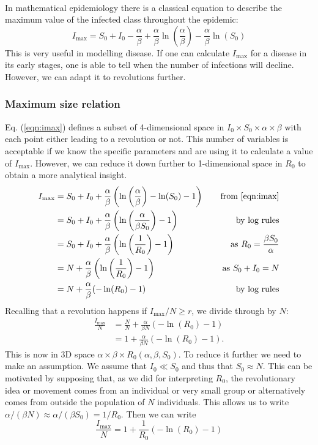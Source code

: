 \\
In mathematical epidemiology there is a classical equation to describe the maximum value of the infected class throughout the epidemic\cite{martcheva}:
\begin{equation}\label{eqn:imax}
	I_{\max}=S_0+I_0-\frac{\alpha}{\beta}+\frac{\alpha}{\beta}\ln\left(\frac{\alpha}{\beta}\right)-\frac{\alpha}{\beta}\ln(S_0)
\end{equation}\label{mmd}
This is very useful in modelling disease. If one can calculate $I_{\max}$ for a disease in its early stages, one is able to tell when the number of infections will decline\cite{martcheva}. However, we can adapt it to revolutions further.
\subsubsection{Maximum size relation}
Eq. (\ref{eqn:imax}) defines a subset of 4-dimensional space in $I_0\times S_0\times\alpha\times\beta$ with each point either leading to a revolution or not. This number of variables is acceptable if we know the specific parameters and are using it to calculate a value of $I_{\max}$. However, we can reduce it down further to 1-dimensional space in $R_0$ to obtain a more analytical insight.
\begin{align*}
I_{\max}&=S_0+I_0+\frac{\alpha}{\beta}\left(\ln\left(\frac{\alpha}{\beta}\right)-\ln(S_0)-1\right)\hspace*{0.4cm} &\text{from \ref{eqn:imax}}\\
&=S_0+I_0+\frac{\alpha}{\beta}\left(\ln\left(\frac{\alpha}{\beta S_0}\right)-1\right)\hspace*{0.4cm} &\text{by log rules}\\
&=S_0+I_0+\frac{\alpha}{\beta}\left(\ln\left(\frac{1}{R_0}\right)-1\right)\hspace*{0.4cm} &\text{as } R_0=\frac{\beta S_0}{\alpha}\\
&=N+\frac{\alpha}{\beta}\left(\ln\left(\frac{1}{R_0}\right)-1\right)\hspace*{0.4cm} &\text{as }S_0+I_0=N\\
&=N+\frac{\alpha}{\beta}(-\ln(R_0)-1)\hspace*{0.4cm} &\text{by log rules}
\end{align*}
Recalling that a revolution happens if $I_{\max}/N\geq r$, we divide through by $N$:
\begin{align*}
\frac{I_{\max}}{N}&=\frac{N}{N}+\frac{\alpha}{\beta N}(-\ln(R_0)-1)\\
&=1+\frac{\alpha}{\beta N}(-\ln(R_0)-1).
\end{align*}
This is now in 3D space $\alpha\times\beta\times R_0(\alpha,\beta,S_0)$. To reduce it further we need to make an assumption. We assume that $I_0\ll S_0$ and thus that $S_0\approx N$. This can be motivated by supposing that, as we did for interpreting $R_0$, the revolutionary idea or movement comes from an individual or very small group or alternatively comes from outside the population of $N$ individuals. This allows us to write $\alpha/(\beta N)\approx \alpha/(\beta S_0)=1/R_0$. Then we can write \[\frac{I_{\max}}{N}=1+\frac{1}{R_0}(-\ln(R_0)-1)\]
